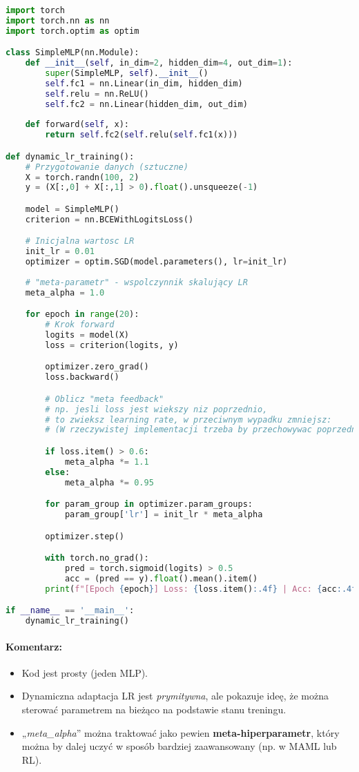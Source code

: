 \documentclass[12pt,a4paper]{article}
\begin{document}
\begin{lstlisting}[language=Python, caption=Adaptacja learning rate w trakcie treningu (PyTorch + pseudo meta-learning)]
import torch
import torch.nn as nn
import torch.optim as optim

class SimpleMLP(nn.Module):
    def __init__(self, in_dim=2, hidden_dim=4, out_dim=1):
        super(SimpleMLP, self).__init__()
        self.fc1 = nn.Linear(in_dim, hidden_dim)
        self.relu = nn.ReLU()
        self.fc2 = nn.Linear(hidden_dim, out_dim)
    
    def forward(self, x):
        return self.fc2(self.relu(self.fc1(x)))

def dynamic_lr_training():
    # Przygotowanie danych (sztuczne)
    X = torch.randn(100, 2)
    y = (X[:,0] + X[:,1] > 0).float().unsqueeze(-1)

    model = SimpleMLP()
    criterion = nn.BCEWithLogitsLoss()

    # Inicjalna wartosc LR
    init_lr = 0.01
    optimizer = optim.SGD(model.parameters(), lr=init_lr)
    
    # "meta-parametr" - wspolczynnik skalujący LR
    meta_alpha = 1.0

    for epoch in range(20):
        # Krok forward
        logits = model(X)
        loss = criterion(logits, y)

        optimizer.zero_grad()
        loss.backward()

        # Oblicz "meta feedback"
        # np. jesli loss jest wiekszy niz poprzednio,
        # to zwieksz learning rate, w przeciwnym wypadku zmniejsz:
        # (W rzeczywistej implementacji trzeba by przechowywac poprzednia strate)

        if loss.item() > 0.6:
            meta_alpha *= 1.1
        else:
            meta_alpha *= 0.95

        for param_group in optimizer.param_groups:
            param_group['lr'] = init_lr * meta_alpha

        optimizer.step()

        with torch.no_grad():
            pred = torch.sigmoid(logits) > 0.5
            acc = (pred == y).float().mean().item()
        print(f"[Epoch {epoch}] Loss: {loss.item():.4f} | Acc: {acc:.4f} | LR: {optimizer.param_groups[0]['lr']:.6f}")

if __name__ == '__main__':
    dynamic_lr_training()
\end{lstlisting}

\paragraph{Komentarz:}
\begin{itemize}
    \item Kod jest prosty (jeden MLP).
    \item Dynamiczna adaptacja LR jest \emph{prymitywna}, ale pokazuje ideę, że można sterować parametrem na bieżąco na podstawie stanu treningu.
    \item „\emph{meta\_alpha}” można traktować jako pewien \textbf{meta-hiperparametr}, który można by dalej uczyć w sposób bardziej zaawansowany (np. w MAML lub RL).
\end{itemize}
\end{document}
